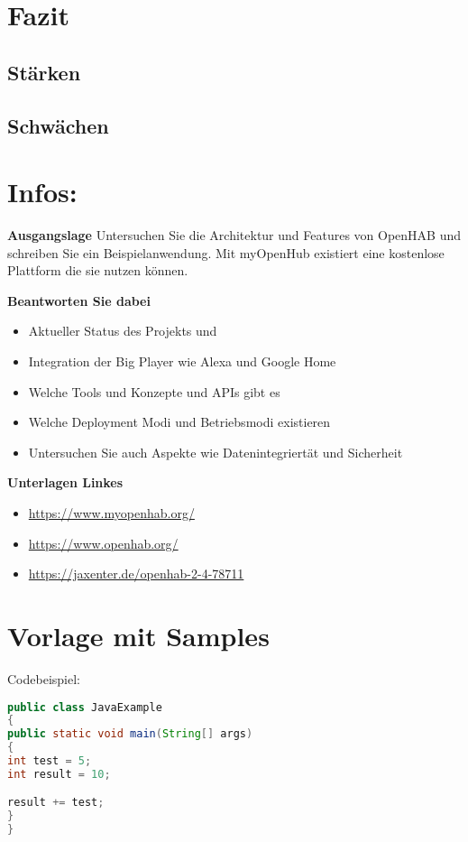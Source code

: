 \section{Fazit}
\subsection{Stärken}
\subsection{Schwächen}

\section{Infos:}
\textbf{Ausgangslage}
Untersuchen Sie die Architektur und Features von OpenHAB und
schreiben Sie ein Beispielanwendung.
Mit myOpenHub existiert eine kostenlose Plattform die sie nutzen
können.

\textbf{Beantworten Sie dabei}
\begin{itemize}
 \item Aktueller Status des Projekts und  \item Integration der Big Player wie Alexa und Google Home
 \item Welche Tools und Konzepte und APIs gibt es
 \item Welche Deployment Modi und Betriebsmodi existieren
 \item Untersuchen Sie auch Aspekte wie Datenintegriertät und Sicherheit
\end{itemize}

\textbf{Unterlagen Linkes}
\begin{itemize}
	\item \url{https://www.myopenhab.org/}
	\item \url{https://www.openhab.org/}
	\item \url{https://jaxenter.de/openhab-2-4-78711}
\end{itemize}


\section{Vorlage mit Samples}

Codebeispiel:
\begin{lstlisting}[language=java,firstnumber=1,caption=Java Beispiel,label=lst:example]
public class JavaExample 
{
public static void main(String[] args) 
{
int test = 5;
int result = 10;

result += test;
}
}
\end{lstlisting}

